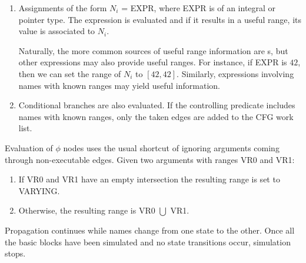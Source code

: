 \begin{enumerate}
\item	Assignments of the form $N_i$ = EXPR, where EXPR is of
	an integral or pointer type.  The expression is evaluated
	and if it results in a useful range, its value is
	associated to $N_i$.
	
	Naturally, the more common sources of useful range
	information are s, but other
	expressions may also provide useful ranges.  For
	instance, if EXPR is $42$, then we can set the range of
	$N_i$ to $[42, 42]$.  Similarly, expressions involving
	names with known ranges may yield useful information.

\item	Conditional branches are also evaluated.  If the
	controlling predicate includes names with known ranges,
	only the taken edges are added to the CFG work list.
\end{enumerate}

Evaluation of $\phi$ nodes uses the usual shortcut of ignoring
arguments coming through non-executable edges.  Given two
arguments with ranges VR0 and VR1:

\begin{enumerate}
\item	If VR0 and VR1 have an empty intersection the resulting
	range is set to VARYING.

\item	Otherwise, the resulting range is VR0 $\bigcup$ VR1.
\end{enumerate}

Propagation continues while names change from one state to the
other.  Once all the basic blocks have been simulated and no
state transitions occur, simulation stops.
